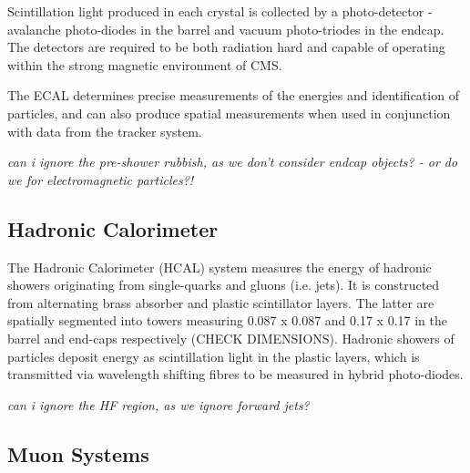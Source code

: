 Scintillation light produced in each crystal is collected by a photo-detector - 
avalanche photo-diodes in the barrel and vacuum photo-triodes in the endcap. The
detectors are required to be both radiation hard and capable of operating within
the strong magnetic environment of CMS.

The ECAL determines precise measurements of the energies and identification of
particles, and can also produce spatial measurements when used in conjunction 
with data from the tracker system.

\emph{can i ignore the pre-shower rubbish, as we don't consider endcap objects? 
- or do we for electromagnetic particles?!}

\subsection{Hadronic Calorimeter}


The Hadronic Calorimeter (HCAL) system measures the energy of hadronic showers 
originating from single-quarks and gluons (i.e. jets). It is constructed from
alternating  brass absorber and plastic scintillator layers. The latter are spatially 
segmented into towers measuring 0.087 x 0.087 and 0.17 x 0.17 in the barrel and 
end-caps respectively (CHECK DIMENSIONS). Hadronic showers of particles deposit 
energy as scintillation light in the plastic layers, which is transmitted via 
wavelength shifting fibres to be measured in hybrid photo-diodes. 

\emph{can i ignore the HF region, as we ignore forward jets?}

\subsection{Muon Systems}


